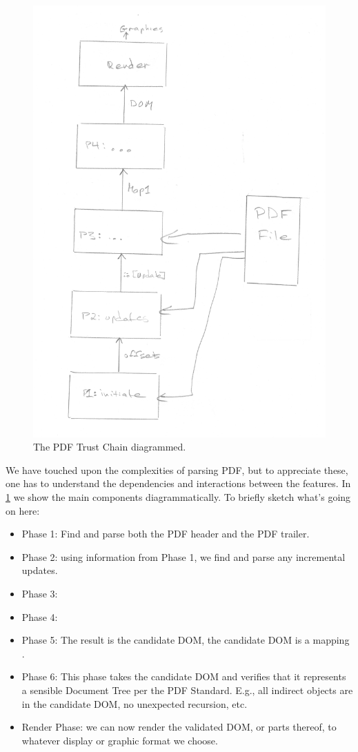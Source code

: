 \begin{figure}[t]
    \centering
    \includegraphics[width=0.8\linewidth]{figures/trustchain-diagram.png}
    \caption{The PDF Trust Chain diagrammed.}
    \label{fig:pdf-trust-chain}
\end{figure}

We have touched upon the complexities of parsing
PDF, but to appreciate these, one has to understand the
dependencies and interactions between the features.
In \cref{fig:pdf-trust-chain} we show the main components diagrammatically.
To briefly sketch what's going on here:
\begin{itemize}
\item Phase 1: Find and parse both the PDF header and the PDF trailer.

\item Phase 2: using information from Phase 1, we find and parse any incremental
  updates.

\item Phase 3: 
  
\item Phase 4: 
  
\item Phase 5:  The result is the candidate DOM, the candidate DOM is
  a mapping .
\item Phase 6: This phase takes the candidate DOM and verifies that it
  represents a sensible Document Tree per the PDF Standard.  E.g., all indirect
  objects are in the candidate DOM, no unexpected recursion, etc.
\item Render Phase: we can now render the validated DOM, or parts thereof, to
  whatever display or graphic format we choose.
\end{itemize}


